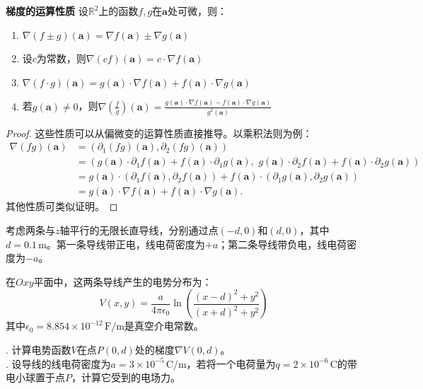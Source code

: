 \documentclass[12pt,UTF8]{ctexbook}
\begin{document}
\begin{tm}{\textbf{梯度的运算性质}}
设$\mathbb{R}^2$上的函数$f, g$在$\mathbf{a}$处可微，则：
\begin{enumerate}
\item $\nabla (f \pm g)(\mathbf{a}) = \nabla f(\mathbf{a}) \pm \nabla g(\mathbf{a})$
\item 设$c$为常数，则$\nabla (cf)(\mathbf{a}) = c\cdot \nabla f(\mathbf{a})$
\item $\nabla(f\cdot g)(\mathbf{a}) = g(\mathbf{a})\cdot \nabla f(\mathbf{a}) + f(\mathbf{a})\cdot \nabla g(\mathbf{a})$
\item 若$g(\mathbf{a}) \neq 0$，则$\displaystyle\nabla\left(\frac{f}{g}\right)(\mathbf{a}) = \frac{g(\mathbf{a})\cdot \nabla f(\mathbf{a}) - f(\mathbf{a})\cdot \nabla g(\mathbf{a})}{g^2(\mathbf{a})}$
\end{enumerate}
\end{tm}
\begin{proof}
这些性质可以从偏微变的运算性质直接推导。以乘积法则为例：
\begin{align*}
\nabla(fg)(\mathbf{a}) &= (\partial_1(fg)(\mathbf{a}), \partial_2(fg)(\mathbf{a})) \\
&= (g(\mathbf{a})\cdot \partial_1 f(\mathbf{a}) + f(\mathbf{a})\cdot \partial_1 g(\mathbf{a}),\,\, g(\mathbf{a})\cdot \partial_2 f(\mathbf{a}) + f(\mathbf{a})\cdot \partial_2 g(\mathbf{a})) \\
&= g(\mathbf{a})\cdot (\partial_1 f(\mathbf{a}), \partial_2 f(\mathbf{a})) + f(\mathbf{a})\cdot (\partial_1 g(\mathbf{a}), \partial_2 g(\mathbf{a})) \\
&= g(\mathbf{a})\cdot \nabla f(\mathbf{a}) + f(\mathbf{a})\cdot \nabla g(\mathbf{a}).
\end{align*}
其他性质可类似证明。
\end{proof}

\begin{et}
考虑两条与$z$轴平行的无限长直导线，分别通过点$(-d,0)$和$(d,0)$，其中$d=0.1\,\mathrm{m}$。第一条导线带正电，线电荷密度为$+a$；第二条导线带负电，线电荷密度为$-a$。

在$Oxy$平面中，这两条导线产生的电势分布为：
$$ V(x,y) = \frac{a}{4\pi\epsilon_0} \ln\left(\frac{(x-d)^2+y^2}{(x+d)^2+y^2}\right) $$
其中$\epsilon_0 = 8.854\times10^{-12}\,\mathrm{F/m}$是真空介电常数。

. 计算电势函数$V$在点$P(0,d)$处的梯度$\nabla V(0,d)$。\\
. 设导线的线电荷密度为$a=3\times10^{-5}\,\mathrm{C/m}$，若将一个电荷量为$q=2\times10^{-6}\,\mathrm{C}$的带电小球置于点$P$，计算它受到的电场力。
\end{et}
\end{document}
